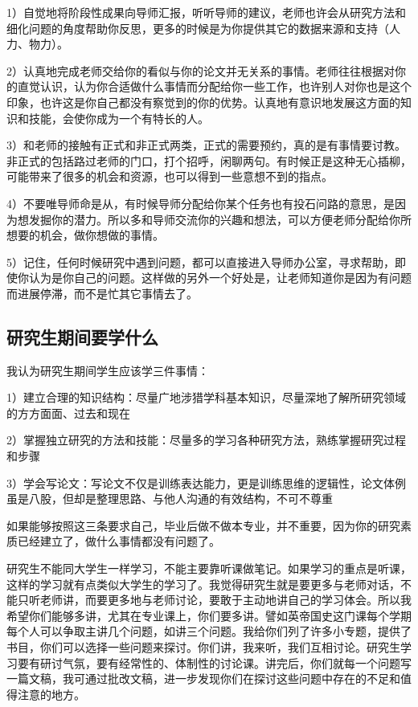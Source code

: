 \documentclass[11pt]{article}
\begin{document}
1）自觉地将阶段性成果向导师汇报，听听导师的建议，老师也许会从研究方法和细化问题的角度帮助你反思，更多的时候是为你提供其它的数据来源和支持（人力、物力）。

2）认真地完成老师交给你的看似与你的论文并无关系的事情。老师往往根据对你的直觉认识，认为你合适做什么事情而分配给你一些工作，也许别人对你也是这个印象，也许这是你自己都没有察觉到的你的优势。认真地有意识地发展这方面的知识和技能，会使你成为一个有特长的人。

3）和老师的接触有正式和非正式两类，正式的需要预约，真的是有事情要讨教。非正式的包括路过老师的门口，打个招呼，闲聊两句。有时候正是这种无心插柳，可能带来了很多的机会和资源，也可以得到一些意想不到的指点。

4）不要唯导师命是从，有时候导师分配给你某个任务也有投石问路的意思，是因为想发掘你的潜力。所以多和导师交流你的兴趣和想法，可以方便老师分配给你所想要的机会，做你想做的事情。

5）记住，任何时候研究中遇到问题，都可以直接进入导师办公室，寻求帮助，即使你认为是你自己的问题。这样做的另外一个好处是，让老师知道你是因为有问题而进展停滞，而不是忙其它事情去了。

\subsection{研究生期间要学什么}
我认为研究生期间学生应该学三件事情：

1）建立合理的知识结构：尽量广地涉猎学科基本知识，尽量深地了解所研究领域的方方面面、过去和现在

2）掌握独立研究的方法和技能：尽量多的学习各种研究方法，熟练掌握研究过程和步骤

3）学会写论文：写论文不仅是训练表达能力，更是训练思维的逻辑性，论文体例虽是八股，但却是整理思路、与他人沟通的有效结构，不可不尊重

如果能够按照这三条要求自己，毕业后做不做本专业，并不重要，因为你的研究素质已经建立了，做什么事情都没有问题了。

研究生不能同大学生一样学习，不能主要靠听课做笔记。如果学习的重点是听课，这样的学习就有点类似大学生的学习了。我觉得研究生就是要更多与老师对话，不能只听老师讲，而要更多地与老师讨论，要敢于主动地讲自己的学习体会。所以我希望你们能够多讲，尤其在专业课上，你们要多讲。譬如英帝国史这门课每个学期每个人可以争取主讲几个问题，如讲三个问题。我给你们列了许多小专题，提供了书目，你们可以选择一些问题来探讨。你们讲，我来听，我们互相讨论。研究生学习要有研讨气氛，要有经常性的、体制性的讨论课。讲完后，你们就每一个问题写一篇文稿，我可通过批改文稿，进一步发现你们在探讨这些问题中存在的不足和值得注意的地方。
\end{document}
